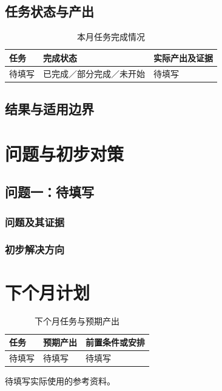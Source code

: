 \documentclass[stage2]{ydzjreport}
\begin{document}
\subsection{任务状态与产出}
\begin{table}[H]\centering
\caption{本月任务完成情况}
\begin{tabularx}{\textwidth}{@{}Y Y Y@{}}
\toprule
{} 任务 & 完成状态 & 实际产出及证据 \\
\midrule
待填写 & 已完成／部分完成／未开始 & 待填写 \\
\bottomrule
\end{tabularx}
\end{table}
\subsection{结果与适用边界}

\section{问题与初步对策}
\subsection{问题一：待填写}
\subsubsection{问题及其证据}
\subsubsection{初步解决方向}

\section{下个月计划}
\begin{table}[H]\centering
\caption{下个月任务与预期产出}
\begin{tabularx}{\textwidth}{@{}Y Y Y@{}}
\toprule
{} 任务 & 预期产出 & 前置条件或安排 \\
\midrule
待填写 & 待填写 & 待填写 \\
\bottomrule
\end{tabularx}
\end{table}

\begin{thebibliography}{9}
 待填写实际使用的参考资料。
\end{thebibliography}
\end{document}
